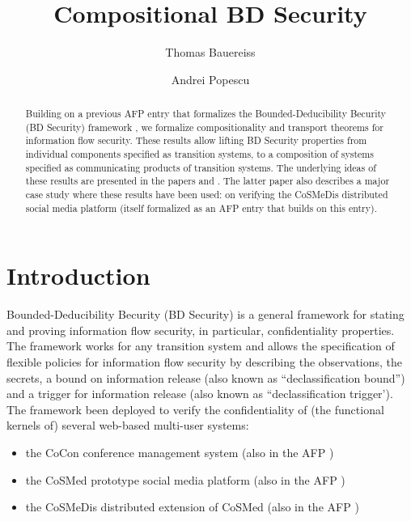\documentclass[11pt,a4paper]{article}
\begin{document}
\title{Compositional BD Security}
\author{Thomas Bauereiss \and Andrei Popescu}
\maketitle

\begin{abstract}
Building on a previous AFP entry \cite{BDSecurity-AFP} that formalizes
the Bounded-Deducibility Becurity (BD Security) framework \cite{BDsecurity-ITP2021},
we formalize compositionality and transport theorems for information flow security. These results allow lifting
BD Security properties from individual components specified as transition systems,
to a composition of systems specified as communicating products of transition systems.
The underlying ideas of these results are presented in
the papers \cite{BDsecurity-ITP2021} and \cite{cosmedis-SandP2017}. The latter paper also describes a major case study where these results have been used: on verifying the CoSMeDis distributed social media platform (itself formalized as an AFP entry \cite{cosmedis-AFP} that builds on this entry).
\end{abstract}

\tableofcontents

\section{Introduction}



Bounded-Deducibility Becurity (BD Security) \cite{BDsecurity-ITP2021} is a general
framework for stating and proving information flow security, in particular, confidentiality properties.  The framework works for any transition system and allows the specification of flexible policies for information flow security by describing the observations, the secrets, a bound on information release (also known as ``declassification bound'') and a trigger for information release (also known as ``declassification trigger').  The framework been deployed to verify the confidentiality of (the functional kernels of) several web-based multi-user systems:
\begin{itemize}
	\item the CoCon conference management system \cite{cocon-CAV2014,cocon-JAR2021} (also in the AFP \cite{cocon-AFP})
	\item the CoSMed prototype social media platform
	\cite{cosmed-itp2016,cosmed-jar2018}
	(also in the AFP \cite{cosmed-AFP})
	\item the CoSMeDis distributed extension of CoSMed
	\cite{cosmedis-SandP2017}
	(also in the AFP \cite{cosmedis-AFP})
\end{itemize}
\end{document}
